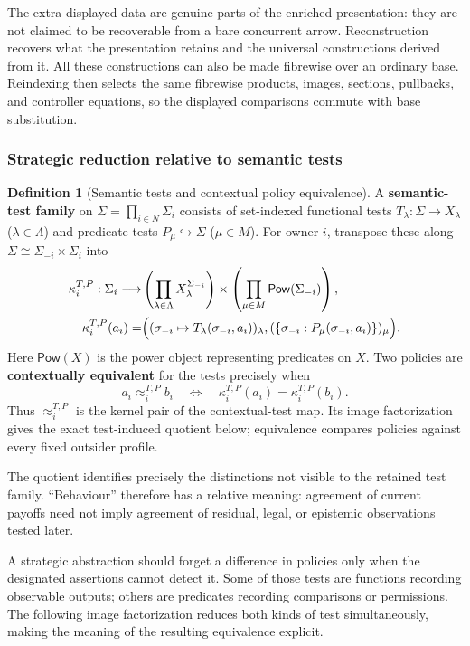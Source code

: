 \documentclass[11pt,a4paper]{article}
\numberwithin{equation}{section}
\theoremstyle{definition}
\newtheorem{definition}[theorem]{Definition}
\theoremstyle{remark}
\theoremstyle{plain}
\begin{document}
The extra displayed data are genuine parts of the enriched
presentation: they are not claimed to be recoverable from a bare
concurrent arrow. Reconstruction recovers what the presentation
retains and the universal constructions derived from it.
All these constructions can also be made fibrewise over an
ordinary base. Reindexing then selects the same fibrewise products,
images, sections, pullbacks, and controller equations, so the
displayed comparisons commute with base substitution.

\subsubsection{Strategic reduction relative to semantic tests}

\begin{definition}[Semantic tests and contextual policy equivalence]
\label{def:egt-semantic-policy-tests}
A \textbf{semantic-test family} on
$\Sigma=\prod_{i\in N}\Sigma_i$ consists of set-indexed functional
tests $T_\lambda:\Sigma\to X_\lambda$ ($\lambda\in\Lambda$) and
predicate tests $P_\mu\hookrightarrow\Sigma$ ($\mu\in M$).
For owner $i$, transpose these along
$\Sigma\cong\Sigma_{-i}\times\Sigma_i$ into
\[
 \begin{split}
 \kappa_i^{T,P}:\Sigma_i\longrightarrow
 &\left(\prod_{\lambda\in\Lambda}X_\lambda^{\Sigma_{-i}}\right)
  \times\left(\prod_{\mu\in M}\mathsf{Pow}(\Sigma_{-i})\right),\\
 \kappa_i^{T,P}(a_i)=
 &\Bigl(
  (\sigma_{-i}\mapsto T_\lambda(\sigma_{-i},a_i))_\lambda,
  (\{\sigma_{-i}:P_\mu(\sigma_{-i},a_i)\})_\mu
  \Bigr).
 \end{split}
\]
Here $\mathsf{Pow}(X)$ is the power object representing predicates on
$X$. Two policies are \textbf{contextually equivalent} for the tests
precisely when
\[
 a_i\approx_i^{T,P}b_i
 \quad\Longleftrightarrow\quad
 \kappa_i^{T,P}(a_i)=\kappa_i^{T,P}(b_i).
\]
Thus $\approx_i^{T,P}$ is the kernel pair of the contextual-test map.
Its image factorization gives the exact test-induced quotient below;
equivalence compares policies against every fixed outsider profile.
\end{definition}
The quotient identifies precisely the distinctions not visible to
the retained test family. ``Behaviour'' therefore has a relative meaning:
agreement of current payoffs need not imply agreement of residual,
legal, or epistemic observations tested later.

A strategic abstraction should forget a difference in policies
only when the designated assertions cannot detect it. Some of those
tests are functions recording observable outputs; others are
predicates recording comparisons or permissions. The following image
factorization reduces both kinds of test simultaneously, making the
meaning of the resulting equivalence explicit.
\end{document}
